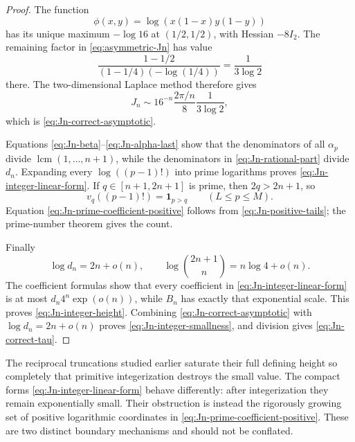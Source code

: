 \begin{proof}
The function
\[
 \phi(x,y)=\log(x(1-x)y(1-y))
\]
has its unique maximum \(-\log16\) at \((1/2,1/2)\), with Hessian
\(-8I_2\).  The remaining factor in \eqref{eq:asymmetric-Jn} has value
\[
 \frac{1-1/2}{(1-1/4)(-\log(1/4))}=\frac1{3\log2}
\]
there.  The two-dimensional Laplace method therefore gives
\[
 J_n\sim16^{-n}\frac{2\pi/n}{8}\frac1{3\log2},
\]
which is \eqref{eq:Jn-correct-asymptotic}.

Equations \eqref{eq:Jn-beta}--\eqref{eq:Jn-alpha-last} show that the
denominators of all \(\alpha_p\) divide
\(\operatorname{lcm}(1,\ldots,n+1)\), while the denominators in
\eqref{eq:Jn-rational-part} divide \(d_n\).  Expanding every
\(\log((p-1)!)\) into prime logarithms proves
\eqref{eq:Jn-integer-linear-form}.  If \(q\in[n+1,2n+1]\) is prime, then
\(2q>2n+1\), so
\[
 v_q((p-1)!)=\mathbf1_{p>q}\qquad(L\le p\le M).
\]
Equation \eqref{eq:Jn-prime-coefficient-positive} follows from
\eqref{eq:Jn-positive-tails}; the prime-number theorem gives the count.

Finally
\[
 \log d_n=2n+o(n),\qquad
 \log\binom{2n+1}{n}=n\log4+o(n).
\]
The coefficient formulas show that every coefficient in
\eqref{eq:Jn-integer-linear-form} is at most
\(d_n4^n\exp(o(n))\), while \(B_n\) has exactly that exponential scale.
This proves \eqref{eq:Jn-integer-height}.  Combining
\eqref{eq:Jn-correct-asymptotic} with \(\log d_n=2n+o(n)\) proves
\eqref{eq:Jn-integer-smallness}, and division gives
\eqref{eq:Jn-correct-tau}.
\end{proof}

\begin{remark}
The reciprocal truncations studied earlier saturate their full defining
height so completely that primitive integerization destroys the small
value.  The compact forms \eqref{eq:Jn-integer-linear-form} behave
differently: after integerization they remain exponentially small.  Their
obstruction is instead the rigorously growing set of positive logarithmic
coordinates in \eqref{eq:Jn-prime-coefficient-positive}.  These are two
distinct boundary mechanisms and should not be conflated.
\end{remark}
